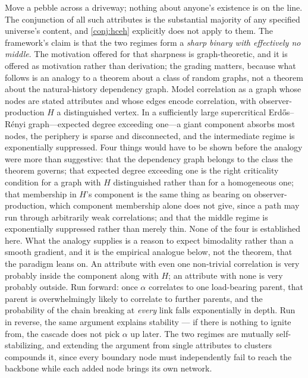 \documentclass[11pt]{article}
\theoremstyle{definition}
\begin{document}
Move a pebble across a driveway; nothing about anyone's existence is on the line. The conjunction of all such attributes is the substantial majority of any specified universe's content, and \autoref{conj:hceh} explicitly does not apply to them. The framework's claim is that the two regimes form a \emph{sharp binary with effectively no middle}. The motivation offered for that sharpness is graph-theoretic, and it is offered as motivation rather than derivation; the grading matters, because what follows is an analogy to a theorem about a class of random graphs, not a theorem about the natural-history dependency graph. Model correlation as a graph whose nodes are stated attributes and whose edges encode correlation, with observer-production $H$ a distinguished vertex. In a sufficiently large supercritical Erd\H{o}s--R\'enyi graph---expected degree exceeding one---a giant component absorbs most nodes, the periphery is sparse and disconnected, and the intermediate regime is exponentially suppressed. Four things would have to be shown before the analogy were more than suggestive: that the dependency graph belongs to the class the theorem governs; that expected degree exceeding one is the right criticality condition for a graph with $H$ distinguished rather than for a homogeneous one; that membership in $H$'s component is the same thing as bearing on observer-production, which component membership alone does not give, since a path may run through arbitrarily weak correlations; and that the middle regime is exponentially suppressed rather than merely thin. None of the four is established here. What the analogy supplies is a reason to expect bimodality rather than a smooth gradient, and it is the empirical analogue below, not the theorem, that the paradigm leans on. An attribute with even one non-trivial correlation is very probably inside the component along with $H$; an attribute with none is very probably outside. Run forward: once $\alpha$ correlates to one load-bearing parent, that parent is overwhelmingly likely to correlate to further parents, and the probability of the chain breaking at \emph{every} link falls exponentially in depth. Run in reverse, the same argument explains stability --- if there is nothing to ignite from, the cascade does not pick $\alpha$ up later. The two regimes are mutually self-stabilizing, and extending the argument from single attributes to clusters compounds it, since every boundary node must independently fail to reach the backbone while each added node brings its own network.
\end{document}

